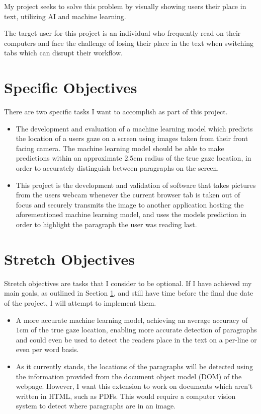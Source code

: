 \documentclass[twocolumn]{report}
\begin{document}
My project seeks to solve this problem by visually showing users their place in text, utilizing AI and machine learning. 

The target user for this project is an individual who frequently read on their computers and face the challenge of losing their place in the text when switching tabs which can disrupt their workflow. 

\section{Specific Objectives}\label{sec:specific-objectives}

There are two specific tasks I want to accomplish as part of this project. 

\begin{itemize}
    \item The development and evaluation of a machine learning model which predicts the location of a users gaze on a screen using images taken from their front facing camera. The machine learning model should be able to make predictions within an approximate $2.5\text{cm}$ radius of the true gaze location, in order to accurately distinguish between paragraphs on the screen. 
    \item This project is the development and validation of software that takes pictures from the users webcam whenever the current browser tab is taken out of focus and securely transmits the image to another application hosting the aforementioned machine learning model, and uses the models prediction in order to highlight the paragraph the user was reading last. 
\end{itemize}

\section{Stretch Objectives}

Stretch objectives are tasks that I consider to be optional. If I have achieved my main goals, as outlined in Section \ref{sec:specific-objectives}, and still have time before the final due date of the project, I will attempt to implement them. 

\begin{itemize}
    \item A more accurate machine learning model, achieving an average accuracy of $1\text{cm}$ of the true gaze location, enabling more accurate detection of paragraphs and could even be used to detect the readers place in the text on a per-line or even per word basis. 

    \item As it currently stands, the locations of the paragraphs will be detected using the information provided from the document object model (DOM) of the webpage. However, I want this extension to work on documents which aren't written in HTML, such as PDFs. This would require a computer vision system to detect where paragraphs are in an image. 

\end{itemize}
\end{document}
